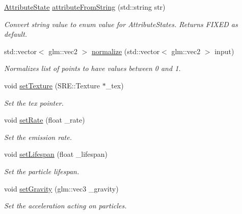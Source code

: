\begin{DoxyCompactItemize}
\item 
\hyperlink{namespace_mason_aefc2ce7d9295b57af46ab6c8ebfc32f7}{Attribute\+State} \hyperlink{struct_mason_1_1_particle_emitter_config_a9ee7a40d6337225cccab9f801e8f793f}{attribute\+From\+String} (std\+::string str)
\begin{DoxyCompactList}\small\item\em Convert string value to enum value for Attribute\+States. Returns F\+I\+X\+ED as default. \end{DoxyCompactList}\item 
std\+::vector$<$ glm\+::vec2 $>$ \hyperlink{struct_mason_1_1_particle_emitter_config_ae3781dff36d32c1fb79a8ff63baf2c55}{normalize} (std\+::vector$<$ glm\+::vec2 $>$ input)
\begin{DoxyCompactList}\small\item\em Normalizes list of points to have values between 0 and 1. \end{DoxyCompactList}\item 
void \hyperlink{struct_mason_1_1_particle_emitter_config_a92978f0e01ba1078889a3f288ff0c02b}{set\+Texture} (S\+R\+E\+::\+Texture $\ast$\+\_\+tex)
\begin{DoxyCompactList}\small\item\em Set the tex pointer. \end{DoxyCompactList}\item 
void \hyperlink{struct_mason_1_1_particle_emitter_config_a8569c3e45131fd9d51687bbf293e3154}{set\+Rate} (float \+\_\+rate)
\begin{DoxyCompactList}\small\item\em Set the emission rate. \end{DoxyCompactList}\item 
void \hyperlink{struct_mason_1_1_particle_emitter_config_afe91ca5c2d60e5567fe589367b4fd3ef}{set\+Lifespan} (float \+\_\+lifespan)
\begin{DoxyCompactList}\small\item\em Set the particle lifespan. \end{DoxyCompactList}\item 
void \hyperlink{struct_mason_1_1_particle_emitter_config_ab34a3cc0d4c7252492a261c063b9376b}{set\+Gravity} (glm\+::vec3 \+\_\+gravity)
\begin{DoxyCompactList}\small\item\em Set the acceleration acting on particles. \end{DoxyCompactList}\item 

\end{DoxyCompactItemize}
